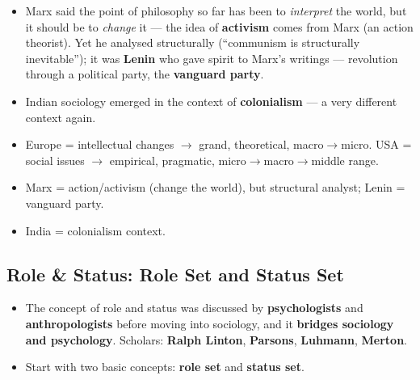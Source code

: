 \begin{CriticalPoint}
\begin{itemize}
\item Marx said the point of philosophy so far has been to \textit{interpret} the world, but it should be to \textit{change} it --- the idea of \textbf{activism} comes from Marx (an action theorist). Yet he analysed structurally (``communism is structurally inevitable''); it was \textbf{Lenin} who gave spirit to Marx's writings --- revolution through a political party, the \textbf{vanguard party}.
\end{itemize}
\end{CriticalPoint}

\begin{DataFact}
\begin{itemize}
\item Indian sociology emerged in the context of \textbf{colonialism} --- a very different context again.
\end{itemize}
\end{DataFact}

\begin{QuickRevision}
\begin{itemize}
\item Europe = intellectual changes $\rightarrow$ grand, theoretical, macro$\rightarrow$micro. USA = social issues $\rightarrow$ empirical, pragmatic, micro$\rightarrow$macro$\rightarrow$middle range.
\item Marx = action/activism (change the world), but structural analyst; Lenin = vanguard party.
\item India = colonialism context.
\end{itemize}
\end{QuickRevision}

\sectiondivider

\subsection{Role \& Status: Role Set and Status Set}

\begin{KeyConcept}
\begin{itemize}
\item The concept of role and status was discussed by \textbf{psychologists} and \textbf{anthropologists} before moving into sociology, and it \textbf{bridges sociology and psychology}. Scholars: \textbf{Ralph Linton}, \textbf{Parsons}, \textbf{Luhmann}, \textbf{Merton}.
\item Start with two basic concepts: \textbf{role set} and \textbf{status set}.
\end{itemize}
\end{KeyConcept}

